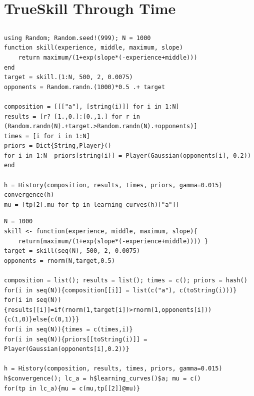 \documentclass[a4paper,11pt]{book}
\theoremstyle{definition}
\newif\ifen
\newif\ifes
\newcommand{\en}[1]{\ifen#1\fi}
\newcommand{\es}[1]{\ifes#1\fi}
\begin{document}
\section{TrueSkill Through Time}

\subsection{\en{Skill evolution}}\label{sec:appendix_skill_evolution}

\en{We attach the \texttt{Julia} and \texttt{R} codes that solve the example presented in the section \ref{sec:skill_evolution} about estimation the skill evolution of a new player. }%
\es{Adjuntamos los c\'odigos de \texttt{Julia} y \texttt{R} que resuelven el ejemplo presentado en la secci\'on \ref{sec:skill_evolution} sobre la evoluci\'on de habilidad de un jugador nuevo. }%
%
\begin{lstlisting}[backgroundcolor=\color{julia!60},caption={\en{\texttt{Julia} code}\es{C\'odigo \texttt{Julia}}},aboveskip=0.0 \baselineskip, belowskip=0.1cm]
using Random; Random.seed!(999); N = 1000
function skill(experience, middle, maximum, slope)
    return maximum/(1+exp(slope*(-experience+middle)))
end
target = skill.(1:N, 500, 2, 0.0075)
opponents = Random.randn.(1000)*0.5 .+ target

composition = [[["a"], [string(i)]] for i in 1:N]
results = [r? [1.,0.]:[0.,1.] for r in (Random.randn(N).+target.>Random.randn(N).+opponents)]
times = [i for i in 1:N]
priors = Dict{String,Player}()
for i in 1:N  priors[string(i)] = Player(Gaussian(opponents[i], 0.2))  end

h = History(composition, results, times, priors, gamma=0.015)
convergence(h)
mu = [tp[2].mu for tp in learning_curves(h)["a"]]
\end{lstlisting}
%
\begin{lstlisting}[backgroundcolor=\color{r!50},caption={\en{\texttt{R} code}\es{C\'odigo \texttt{R}}},aboveskip=0.0 \baselineskip, belowskip=0.1cm]
N = 1000
skill <- function(experience, middle, maximum, slope){
    return(maximum/(1+exp(slope*(-experience+middle)))) }
target = skill(seq(N), 500, 2, 0.0075)
opponents = rnorm(N,target,0.5)

composition = list(); results = list(); times = c(); priors = hash()
for(i in seq(N)){composition[[i]] = list(c("a"), c(toString(i)))}
for(i in seq(N)){results[[i]]=if(rnorm(1,target[i])>rnorm(1,opponents[i])){c(1,0)}else{c(0,1)}}
for(i in seq(N)){times = c(times,i)}
for(i in seq(N)){priors[[toString(i)]] = Player(Gaussian(opponents[i],0.2))}

h = History(composition, results, times, priors, gamma=0.015)
h$convergence(); lc_a = h$learning_curves()$a; mu = c()
for(tp in lc_a){mu = c(mu,tp[[2]]@mu)}
\end{lstlisting}
\end{document}
